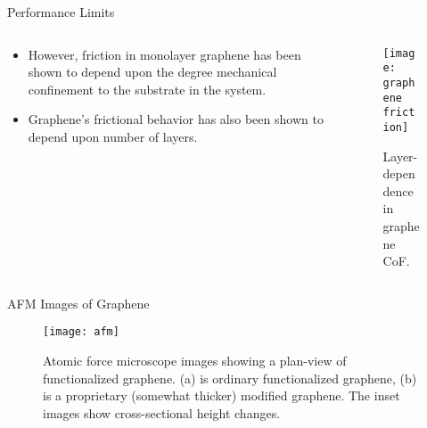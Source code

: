 \documentclass[12pt,letterpaper]{beamer}
\begin{document}
\begin{frame}{Performance Limits}
  \begin{columns}[T]
      \begin{column}{.5\textwidth}
    \begin{block}{}
\begin{itemize}
\item However, friction in monolayer graphene has been shown to depend upon the degree mechanical confinement to the substrate in the system. \cite{PSSB:PSSB201000555}
\item Graphene's frictional behavior has also been shown to depend upon number of layers. \cite{PSSB:PSSB200982329} 
\end{itemize}
        \end{block}
    \end{column}
    \begin{column}{.3\textwidth}
     \begin{block}{}
        \begin{figure}
                \texttt{[image: graphene friction]}
                \caption{Layer-dependence in graphene CoF.}
        \end{figure}
    \end{block}
    \end{column}
  \end{columns}
\end{frame}

\begin{frame}{AFM Images of Graphene}
\begin{figure}
  \centering
    \texttt{[image: afm]}
    \caption[Tapping-mode AFM images of functionalized graphene]{Atomic force microscope images showing a plan-view of functionalized graphene. (a) is ordinary functionalized graphene, (b) is a proprietary (somewhat thicker) modified graphene. The inset images show cross-sectional height changes.}
\end{figure}
\end{frame}
\end{document}
